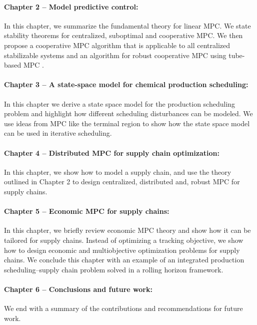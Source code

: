\paragraph{Chapter 2 -- Model predictive control:} In this chapter, we summarize the fundamental theory for linear MPC. We state
stability theorems for centralized, suboptimal and cooperative MPC. We
then propose a cooperative MPC algorithm that is applicable to all
centralized stabilizable systems and an algorithm for robust
cooperative MPC using tube-based MPC \citep[Chapter 3]{rawlings:mayne:2009}.

\paragraph{Chapter 3 -- A state-space model for chemical production
  scheduling:} In this chapter we derive a state space model for the
production scheduling problem and highlight how different scheduling
disturbances can be modeled. We use ideas from MPC like the terminal
region to show how the state space model can be used in iterative scheduling.

\paragraph{Chapter 4 -- Distributed MPC for supply chain
  optimization:} In this chapter, we show how to model a supply chain, and use the theory outlined in
Chapter 2 to design centralized, distributed and, robust MPC for supply
chains.

\paragraph{Chapter 5 -- Economic MPC for supply chains:} In this
chapter, we briefly review economic MPC theory and show how it can be
tailored for supply chains. Instead of optimizing a tracking
objective, we show how to design economic and multiobjective
optimization problems for supply chains. We conclude this chapter with
an example of an integrated production scheduling--supply chain
problem solved in a rolling horizon framework.

\paragraph{Chapter 6 -- Conclusions and future work:} We end with a
summary of the contributions and recommendations for future work.








